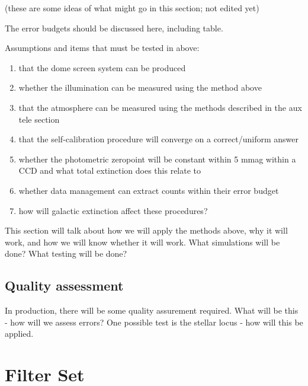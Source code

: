 \documentclass[12pt,preprint]{aastex}
\begin{document}
(these are some ideas of what might go in this section; not edited yet)

The error budgets should be discussed here, including table.

Assumptions and items that must be tested in above: 
\begin{enumerate}
\item{that the dome screen system can be produced}
\item{whether the illumination can be measured using the method above}
\item{that the atmosphere can be measured using the methods described
    in the aux tele section}
\item{that the self-calibration procedure will converge on a
    correct/uniform answer}
\item{whether the photometric zeropoint will be constant within 5 mmag 
    within a CCD and what total extinction does this relate to}
\item{whether data management can extract counts within their error
    budget}
\item{how will galactic extinction affect these procedures?}
\end{enumerate}

This section will talk about how we will apply the methods above, why
it will work, and how we will know whether it will work. What
simulations will be done? What testing
will be done? 


\subsection{Quality assessment}
In production, there will be some quality assurement required. What
will be this - how will we assess errors? 
One possible test is the stellar locus - how will this be applied.


\appendix





\section{Filter Set}
\end{document}

